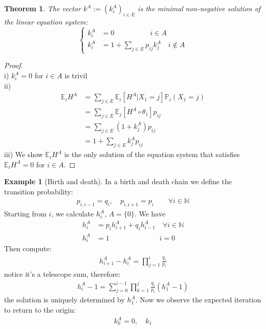 \documentclass[a4paper,11pt]{book}
\newtheorem{theorem}{Theorem}[section]
\theoremstyle{definition}
\newtheorem*{example}{Example}
\theoremstyle{remark}
\begin{document}
\begin{theorem}
	The vector $k^A := (k_i^A)_{i \in E}$ is the minimal non-negative solution of the linear equation system:
	\begin{equation*}
	\left\{
	\begin{aligned}
		k_i^A &= 0 \qquad \qquad \quad i \in A\\
		k_i^A &= 1 +  \sum_{j \in E} p_{ij}k_j^A  \quad i \notin A
	\end{aligned}
	\right.
	\end{equation*}
\end{theorem}
\begin{proof}
\quad\\i) $k_i^A = 0$ for $i \in A$ is trivil\\
ii)
\begin{align*}
	\mathbb{E}_iH^A &=  \sum_{j \in E} \mathbb{E}_i[H^A|X_1 = j]\mathbb{P}_i(X_1 = j)\\
	&= \sum_{j \in E}\mathbb{E}_j[H^A \circ \theta_1]p_{ij}\\
	&= \sum_{j \in E}(1+k_j^A) p_{ij}\\
	&= 1 + \sum_{j \in E} k_j^A p_{ij}
\end{align*}
iii) We show $\mathbb{E}_i H^A$ is the only solution of the equation system that satisfies $\mathbb{E}_iH^A = 0$ for $i \in A$.
\end{proof}

\begin{example}[Birth and death]
	In a birth and death chain we define the transition probability:
	\begin{align*}
		p_{i, i-1} = q_i,\quad p_{i, i+1} = p_i \qquad \forall i \in \mathbb{N}
	\end{align*}
	Starting from $i$, we calculate $h_i^A$, $A = \{0\}$. We have
	\begin{align*}
		h_i^A &= p_ih_{i+1}^A + q_i h_{i-1}^A  \quad \forall i \in \mathbb{N}\\
		h_i^A &= 1 \quad \qquad \qquad\qquad i = 0
	\end{align*}
	Then compute:
	\begin{align*}
		h_{i+1}^A - h_i^A = \prod_{j = 1}^i \frac{q_i}{p_i}
	\end{align*}
	notice it's a telescope sum, therefore:
	\begin{align*}
		h_i^A - 1 = \sum_{j = 0}^{i-1} \prod_{k = 1}^j \frac{q_i}{p_i}(h_1^A - 1)
	\end{align*}
	the solution is uniquely determined by $h_1^A$. Now we observe the expected iteration to return to the origin:
	\begin{align*}
		k_0^A = 0, \quad k_1
	\end{align*}
\end{example}
\end{document}
